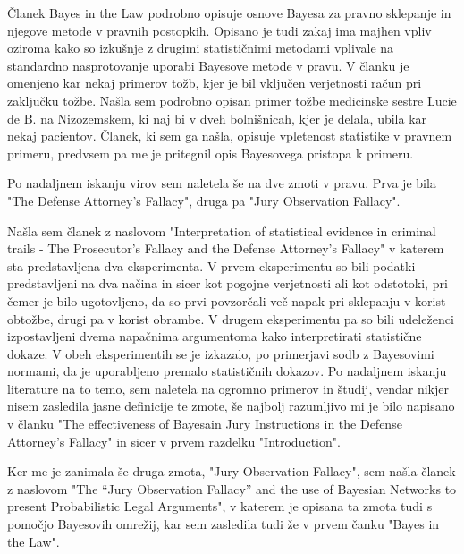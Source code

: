 \documentclass[a4paper,12pt]{article}
\begin{document}
Članek Bayes in the Law podrobno opisuje osnove Bayesa za pravno sklepanje in njegove metode v pravnih postopkih. 
Opisano je tudi zakaj ima majhen vpliv oziroma kako so izkušnje z drugimi statističnimi metodami vplivale na standardno 
nasprotovanje uporabi Bayesove metode v pravu. V članku je omenjeno kar nekaj primerov tožb, kjer je bil vključen verjetnosti račun 
pri zaključku tožbe. Našla sem podrobno opisan primer tožbe medicinske sestre Lucie de B. na Nizozemskem, ki naj bi v dveh bolnišnicah, 
kjer je delala, ubila kar nekaj pacientov. Članek, ki sem ga našla, opisuje vpletenost statistike v pravnem primeru, predvsem pa me je pritegnil
opis Bayesovega pristopa k primeru.

Po nadaljnem iskanju virov sem naletela še na dve zmoti v pravu. Prva je bila "The Defense Attorney's Fallacy", druga pa "Jury Observation Fallacy". 

Našla sem članek z naslovom "Interpretation of statistical evidence in criminal trails - The Prosecutor's Fallacy and the Defense Attorney's Fallacy" v 
katerem sta predstavljena dva eksperimenta. V prvem eksperimentu so bili podatki predstavljeni na dva načina in sicer kot pogojne verjetnosti ali kot odstotoki, 
pri čemer je bilo ugotovljeno, da so prvi povzorčali več napak pri sklepanju v korist obtožbe, drugi pa v korist obrambe. V drugem eksperimentu pa so bili udeleženci 
izpostavljeni dvema napačnima argumentoma kako interpretirati statistične dokaze. V obeh eksperimentih se je izkazalo, po primerjavi sodb z Bayesovimi normami, da je 
uporabljeno premalo statističnih dokazov.
Po nadaljnem iskanju literature na to temo, sem naletela na ogromno primerov in študij, vendar nikjer nisem zasledila jasne definicije te zmote, še najbolj razumljivo mi je 
bilo napisano v članku "The effectiveness of Bayesain Jury Instructions in the Defense Attorney's Fallacy" in sicer v prvem razdelku "Introduction". 

Ker me je zanimala še druga zmota, "Jury Observation Fallacy", sem našla članek z naslovom "The “Jury Observation Fallacy” and the use of Bayesian Networks to present 
Probabilistic Legal Arguments", v katerem je opisana ta zmota tudi s pomočjo Bayesovih omrežij, kar sem zasledila tudi že v prvem čanku "Bayes in the Law". 
\end{document}
